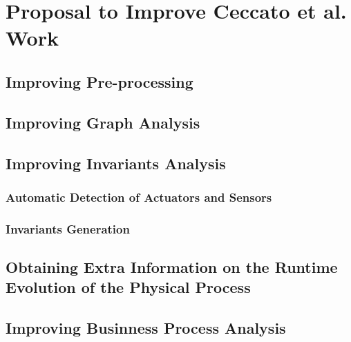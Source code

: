 \chapter{Proposal to Improve Ceccato et al. Work}
\label{proposal}

\section{Improving Pre-processing}
\label{sec:improve_preprocessing}

\section{Improving Graph Analysis}
\label{sec:improve_graphs}

\section{Improving Invariants Analysis}
\label{sec:improve_invariants}

\subsection{Automatic Detection of Actuators and Sensors}
\subsection{Invariants Generation}

\section{Obtaining Extra Information on the Runtime Evolution of the Physical Process}
\label{sec:extra_info}

\section{Improving Businness Process Analysis}
\label{sec:improve_bpa}